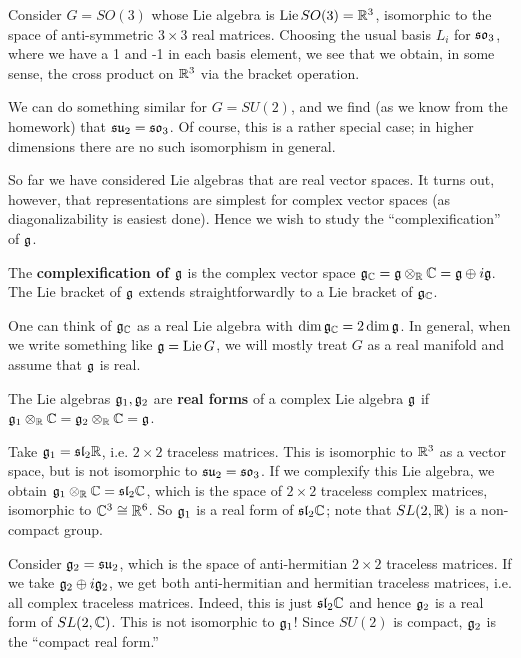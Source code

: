 \documentclass{../mathnotes}
\begin{document}
\begin{exmp}
    Consider $G=SO(3)$ whose Lie algebra is $\operatorname{Lie} SO(3)=\mathbb{R}^3$, isomorphic to the space of anti-symmetric $3\times 3$ real matrices.
    Choosing the usual basis $L_i$ for $\mathfrak{so}_3$, where we have a 1 and -1 in each basis element, we see that we obtain, in some sense,
    the cross product on $\mathbb{R}^3$ via the bracket operation.

    We can do something similar for $G=SU(2)$, and we find (as we know from the homework) that $\mathfrak{su}_2=\mathfrak{so}_3$. Of course, this is a
    rather special case; in higher dimensions there are no such isomorphism in general.
\end{exmp}

So far we have considered Lie algebras that are real vector spaces. It turns out, however, that representations are simplest for
complex vector spaces (as diagonalizability is easiest done). Hence we wish to study the ``complexification'' of $\mathfrak g$.

\begin{defn}
    The \textbf{complexification of $\mathfrak g$} is the complex vector space $\mathfrak g_{\mathbb{C}}=\mathfrak g\otimes_{\mathbb{R}} \mathbb{C}=\mathfrak g\oplus i\mathfrak g$.
    The Lie bracket of $\mathfrak g$ extends straightforwardly to a Lie bracket of $\mathfrak g_{\mathbb{C}}$.
\end{defn}

\begin{rem}
    One can think of $\mathfrak g_{\mathbb{C}}$ as a real Lie algebra with $\dim\mathfrak g_{\mathbb{C}}=2\dim\mathfrak g$. In general, when we write something like $\mathfrak g=\operatorname{Lie} G$,
    we will mostly treat $G$ as a real manifold and assume that $\mathfrak g$ is real.
\end{rem}

\begin{defn}
    The Lie algebras $\mathfrak g_1,\mathfrak g_2$ are \textbf{real forms} of a complex Lie algebra $\mathfrak g$ if $\mathfrak g_1\otimes_{\mathbb{R}}\mathbb{C}=\mathfrak g_2\otimes_{\mathbb{R}}\mathbb{C}=\mathfrak g$.
\end{defn}

\begin{exmp}
    Take $\mathfrak g_1=\mathfrak{sl}_2\mathbb{R}$, i.e. $2\times 2$ traceless matrices. This is isomorphic to $\mathbb{R}^3$ as a vector space, but is not
    isomorphic to $\mathfrak{su}_2=\mathfrak{so}_3$. If we complexify this Lie algebra, we obtain $\mathfrak g_1\otimes_{\mathbb{R}}\mathbb{C}=\mathfrak{sl}_2\mathbb{C}$, which is the space
    of $2\times 2$ traceless complex matrices, isomorphic to $\mathbb{C}^3\cong\mathbb{R}^6$. So $\mathfrak g_1$ is a real form of $\mathfrak{sl}_2\mathbb{C}$; note that $SL(2,\mathbb{R})$ is a 
    non-compact group.

    Consider $\mathfrak g_2=\mathfrak{su}_2$, which is the space of anti-hermitian $2\times 2$ traceless matrices. If we take $\mathfrak g_2\oplus i\mathfrak g_2$, we 
    get both anti-hermitian and hermitian traceless matrices, i.e. all complex traceless matrices. Indeed, this is just $\mathfrak{sl}_2\mathbb{C}$ and hence
    $\mathfrak g_2$ is a real form of $SL(2,\mathbb{C})$. This is not isomorphic to $\mathfrak g_1$! Since $SU(2)$ is compact, $\mathfrak g_2$ is the ``compact real form.''
\end{exmp}
\end{document}
